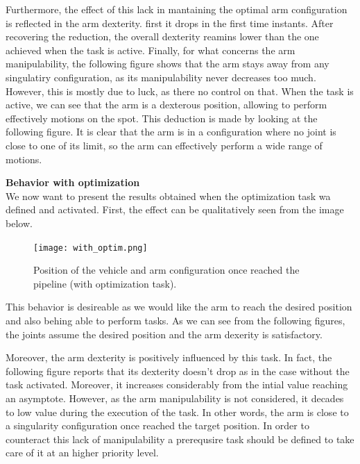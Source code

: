 \documentclass{article}
\begin{document}
Furthermore, the effect of this lack in mantaining the optimal arm configuration is reflected in the arm dexterity. first it drops in the first time instants. After recovering the reduction, the overall dexterity reamins lower than the one achieved when the task is active. Finally, for what concerns the arm manipulability, the following figure shows that the arm stays away from any singulatiry configuration, as its manipulability never decreases too much. However, this is mostly due to luck, as there no control on that. When the task is active, we can see that the arm is a dexterous position, allowing to perform effectively motions on the spot. This deduction is made by looking at the following figure. It is clear that the arm is in a configuration where no joint is close to one of its limit, so the arm can effectively perform a wide range of motions.


{\large \textbf{Behavior with optimization}} \\
We now want to present the results obtained when the optimization task wa defined and activated. First, the effect can be qualitatively seen from the image below. \\

\begin{figure}[H]
	\centering
	{\texttt{[image: with\_optim.png]}}
	\caption{Position of the vehicle and arm configuration once reached the pipeline (with optimization task).}
	\label{im:optim}
\end{figure}


This behavior is desireable as we would like the arm to reach the desired position and also behing able to perform tasks. As we can see from the following figures, the joints assume the desired position and the arm dexerity is satisfactory. 
\begin{figure}[H]
	\centering
	\hspace{10mm}
	\hspace{10mm}
	\label{im:With_optim_results}
\end{figure} 


Moreover, the arm dexterity is positively influenced by this task. In fact, the following figure reports that its dexterity doesn't drop as in the case without the task activated. Moreover, it increases considerably from the intial value reaching an asymptote. However, as the arm manipulability is not considered, it decades to low value during the execution of the task. In other words, the arm is close to a singularity configuration once reached the target position. In order to counteract this lack of manipulability a prerequsire task should be defined to take care of it at an higher priority level.
\end{document}
